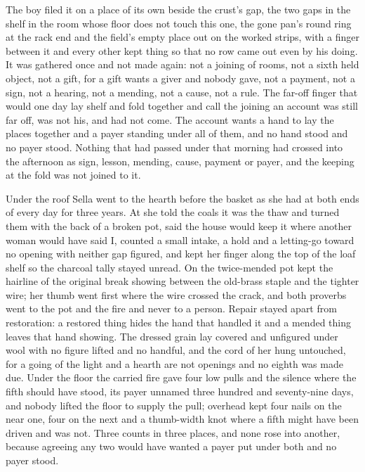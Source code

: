 The boy filed it on a place of its own beside the crust's gap, the two gaps in the shelf in the room whose floor does not touch this one, the gone pan's round ring at the rack end and the field's empty place out on the worked strips, with a finger between it and every other kept thing so that no row came out even by his doing. It was gathered once and not made again: not a joining of rooms, not a sixth held object, not a gift, for a gift wants a giver and nobody gave, not a payment, not a sign, not a hearing, not a mending, not a cause, not a rule. The far-off finger that would one day lay shelf and fold together and call the joining an account was still far off, was not his, and had not come. The account wants a hand to lay the places together and a payer standing under all of them, and no hand stood and no payer stood. Nothing that had passed under  that morning had crossed into the afternoon as sign, lesson, mending, cause, payment or payer, and the keeping at the fold was not joined to it.

Under the roof Sella went to the hearth before the basket as she had at both ends of every day for three years. At  she told the coals it was the thaw and turned them with the back of a broken pot, said the house would keep it where another woman would have said I, counted a small intake, a hold and a letting-go toward no opening with neither gap figured, and kept her finger along the top of the loaf shelf so the charcoal tally stayed unread. On  the twice-mended pot kept the hairline of the original break showing between the old-brass staple and the tighter wire; her thumb went first where the wire crossed the crack, and both proverbs went to the pot and the fire and never to a person. Repair stayed apart from restoration: a restored thing hides the hand that handled it and a mended thing leaves that hand showing. The dressed grain lay covered and unfigured under wool with no figure lifted and no handful, and the cord of her  hung untouched, for a going of the light and a hearth are not openings and no eighth was made due. Under the floor the carried fire gave four low pulls and the silence where the fifth should have stood, its payer unnamed three hundred and seventy-nine days, and nobody lifted the floor to supply the pull; overhead  kept four nails on the near one, four on the next and a thumb-width knot where a fifth might have been driven and was not. Three counts in three places, and none rose into another, because agreeing any two would have wanted a payer put under both and no payer stood.

